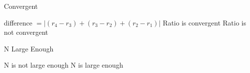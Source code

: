  \begin{algorithm}[t]
    \caption{Convergent}
    \begin{algorithmic}
      \STATE difference $= |(r_4 - r_3) + (r_3 -r_2) + (r_2 - r_1)|$
      \RETURN Ratio is convergent
      \ELSE
      \RETURN Ratio is not convergent
      \ENDIF
    \end{algorithmic}
    \label{alg:convergence}
  \end{algorithm}

 \begin{algorithm}[t]
    \caption{N Large Enough}
    \begin{algorithmic}
      \RETURN N is not large enough
      \ENDIF
      \ENDIF
      \RETURN N is large enough
    \end{algorithmic}
    \label{alg:tuning}
  \end{algorithm}
